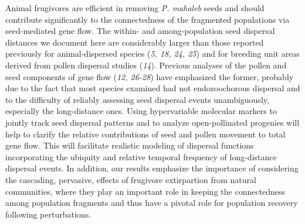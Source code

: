 \documentclass[a4paper,12pt]{article}
\begin{document}
\begin{bibunit}[science]
\begin{linenumbers}
\begin{spacing}{2}
Animal frugivores are efficient in removing \textit{P. mahaleb} seeds and should contribute significantly to the connectedness of the fragmented populations via seed-mediated gene flow. The within- and among-population seed dispersal distances we document here are considerably larger than those reported previously for animal-dispersed species (\textit{5, 18, 24, 25}) and for breeding unit areas derived from pollen dispersal studies (\textit{14}). Previous analyses of the pollen and seed components of gene flow (\textit{12, 26-28}) have emphasized the former, probably due to the fact that most species examined had not endozoochorous dispersal and to the difficulty of reliably assessing seed dispersal events unambiguously, especially the long-distance ones. Using hypervariable molecular markers to jointly track seed dispersal patterns and to analyze open-pollinated progenies will help to clarify the relative contributions of seed and pollen movement to total gene flow. This will facilitate realistic modeling of dispersal functions incorporating the ubiquity and relative temporal frequency of long-distance dispersal events. In addition, our results emphasize the importance of considering the cascading, pervasive, effects of frugivore extirpartion from natural communities, where they play an important role in keeping the connectedness among population fragments and thus have a pivotal role for population recovery following perturbations.

\end{spacing}
\end{linenumbers}
\begin{linenumbers}
\begin{spacing}{1.5}

\end{spacing}
\end{linenumbers}
\end{bibunit}
\end{document}

